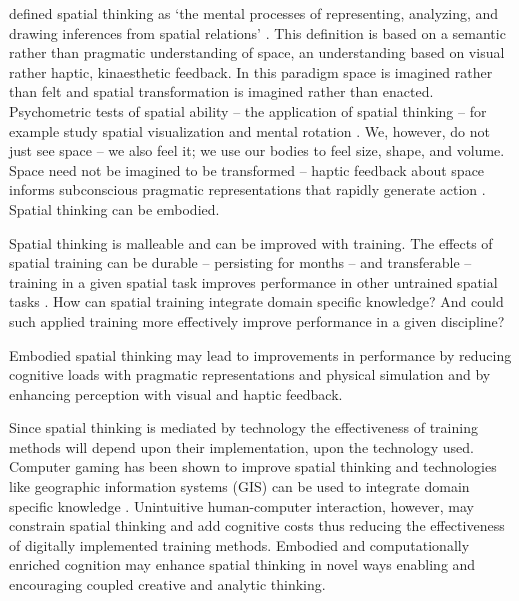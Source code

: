 \cite{Uttal2013} defined spatial thinking as 
`the mental processes of representing, analyzing, and drawing inferences from spatial relations' \cite{Uttal2013}. 
This definition is based on a semantic rather than pragmatic understanding of space, an understanding based on visual rather haptic, kinaesthetic feedback. 
In this paradigm space is imagined rather than felt and spatial transformation is imagined rather than enacted. 
Psychometric tests of spatial ability -- the application of spatial thinking -- for example study spatial visualization and mental rotation \cite{Uttal2013,Uttal2013a,Ormand2014}.
We, however, do not just see space -- we also feel it; we use our bodies to feel size, shape, and volume. 
Space need not be imagined to be transformed -- haptic feedback about space informs subconscious pragmatic representations that rapidly generate action \cite{Jeannerod1997}. Spatial thinking can be embodied.

Spatial thinking is malleable and can be improved with training. 
The effects of spatial training can be durable -- persisting for months -- and transferable -- training in a given spatial task improves performance in other untrained spatial tasks \cite{Uttal2013}. 
How can spatial training integrate domain specific knowledge? And could such applied training more effectively improve performance in a given discipline? \cite{Uttal2013} 

Embodied spatial thinking may lead to improvements in performance by reducing cognitive loads with pragmatic representations and physical simulation and by enhancing perception with visual and haptic feedback. 

Since spatial thinking is mediated by technology the effectiveness of training methods will depend upon their implementation, upon the technology used. 
Computer gaming has been shown to improve spatial thinking and technologies like geographic information systems (GIS) can be used to integrate domain specific knowledge \cite{Uttal2013}.
Unintuitive human-computer interaction, however, may constrain spatial thinking and add cognitive costs thus reducing the effectiveness of digitally implemented training methods. 
Embodied and computationally enriched cognition may enhance spatial thinking in novel ways
enabling and encouraging coupled creative and analytic thinking.




